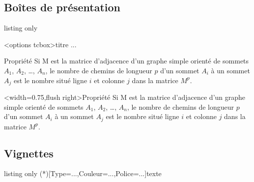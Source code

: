 \documentclass[french,11pt,a4paper]{article}
\begin{document}
\begin{DemoCode}{}
\end{DemoCode}

\begin{DemoCode}{}
\end{DemoCode}

\subsection{Boîtes de présentation}

\begin{DemoCode}{listing only}
\begin{BoiteSimple}[couleur]<options tcbox>{titre}
	...
\end{BoiteSimple}
\end{DemoCode}

\begin{DemoCode}{}
\begin{BoiteSimple}[red]{Propriété}
Si M est la matrice d'adjacence d'un graphe simple orienté de sommets $A_1$, $A_2$, \dots, $A_n$, le nombre de chemins de longueur $p$ d'un sommet $A_i$  à un sommet $A_j$ est le nombre situé ligne $i$ et colonne $j$ dans la matrice $M^p$.
\end{BoiteSimple}
\end{DemoCode}

\begin{DemoCode}{}
\begin{BoiteSimple}[blue]<width=0.75\linewidth,flush right>{Propriété}
Si M est la matrice d'adjacence d'un graphe simple orienté de sommets $A_1$, $A_2$, \dots, $A_n$, le nombre de chemins de longueur $p$ d'un sommet $A_i$  à un sommet $A_j$ est le nombre situé ligne $i$ et colonne $j$ dans la matrice $M^p$.
\end{BoiteSimple}
\end{DemoCode}

\subsection{Vignettes}

\begin{DemoCode}{listing only}
\AffVignette(*)[Type=...,Couleur=...,Police=...]{texte}
\end{DemoCode}
\end{document}
